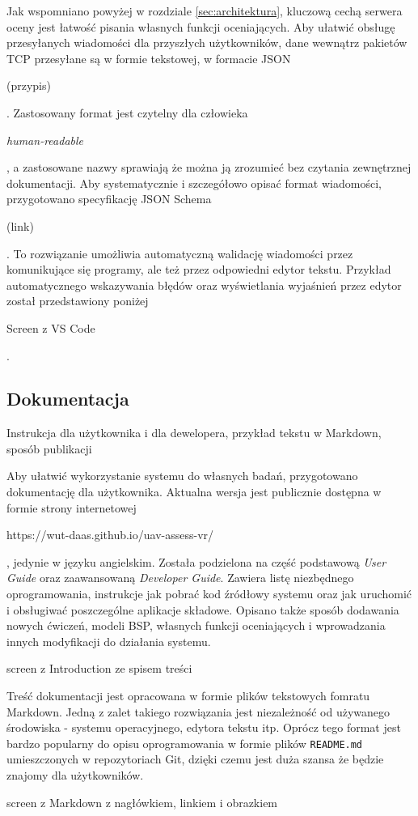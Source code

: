 Jak wspomniano powyżej w rozdziale \ref{sec:architektura}, kluczową cechą serwera oceny jest łatwość pisania własnych funkcji oceniających. Aby ułatwić obsługę przesyłanych wiadomości dla przyszłych użytkowników, dane wewnątrz pakietów TCP przesyłane są w formie tekstowej, w formacie JSON \begin{todo}(przypis)\end{todo}. Zastosowany format jest czytelny dla człowieka \begin{todo}\emph{human-readable}\end{todo}, a zastosowane nazwy sprawiają że można ją zrozumieć bez czytania zewnętrznej dokumentacji. Aby systematycznie i szczegółowo opisać format wiadomości, przygotowano specyfikację JSON Schema \begin{todo}(link)\end{todo}. To rozwiązanie umożliwia automatyczną walidację wiadomości przez komunikujące się programy, ale też przez odpowiedni edytor tekstu. Przykład automatycznego wskazywania błędów oraz wyświetlania wyjaśnień przez edytor został przedstawiony poniżej \begin{todo}Screen z VS Code\end{todo}.

\subsection{Dokumentacja}
\begin{todo}
    Instrukcja dla użytkownika i dla dewelopera, przykład tekstu w Markdown, sposób publikacji
\end{todo}
Aby ułatwić wykorzystanie systemu do własnych badań, przygotowano dokumentację dla użytkownika. Aktualna wersja jest publicznie dostępna w formie strony internetowej \begin{todo}https://wut-daas.github.io/uav-assess-vr/\end{todo}, jedynie w języku angielskim. Została podzielona na część podstawową \emph{User Guide} oraz zaawansowaną \emph{Developer Guide}. Zawiera listę niezbędnego oprogramowania, instrukcje jak pobrać kod źródłowy systemu oraz jak uruchomić i obsługiwać poszczególne aplikacje składowe. Opisano także sposób dodawania nowych ćwiczeń, modeli BSP, własnych funkcji oceniających i wprowadzania innych modyfikacji do działania systemu.
\begin{todo}
    screen z Introduction ze spisem treści
\end{todo}

Treść dokumentacji jest opracowana w formie plików tekstowych fomratu Markdown. Jedną z zalet takiego rozwiązania jest niezależność od używanego środowiska - systemu operacyjnego, edytora tekstu itp. Oprócz tego format jest bardzo popularny do opisu oprogramowania w formie plików \texttt{README.md} umieszczonych w repozytoriach Git, dzięki czemu jest duża szansa że będzie znajomy dla użytkowników.
\begin{todo}
    screen z Markdown z nagłówkiem, linkiem i obrazkiem
\end{todo}

